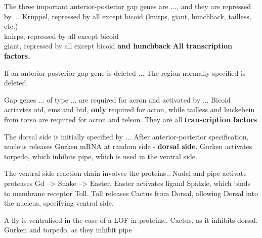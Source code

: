
\begin{flashcard}{The three important anterior-posterior gap genes are ..., and they are repressed by ...}
    Krüppel, repressed by all except bicoid (knirps, giant, hunchback, tailless, etc.) \\
    knirps, repressed by all except bicoid \\
    giant, repressed by all except bicoid \textbf{and hunchback}
    \textbf{All transcription factors.}
\end{flashcard}

\begin{flashcard}{If an anterior-posterior gap gene is deleted ...}
    The region normally specified is deleted.
\end{flashcard}

\begin{flashcard}{Gap genes ... of type ... are required for acron and activated by ...}
    Bicoid actiavtes otd, ems and btd, \textbf{only} required for acron, while tailless and huckebein from torso are required for acron and telson. They are all \textbf{transcription factors}
\end{flashcard}

\begin{flashcard}{The dorsal side is initially specified by ...}
    After anterior-posterior specification, nucleus releases Gurken mRNA at random side - \textbf{dorsal side}. Gurken activates torpedo, which inhibits pipe, which is used in the ventral side. 
\end{flashcard}

\begin{flashcard}{The ventral side reaction chain involves the proteins..}
    Nudel and pipe activate proteases Gd --> Snake --> Easter. Easter activates ligand Spätzle, which binds to membrane receptor Toll. Toll releases Cactus from Dorsal, allowing Dorsal into the nucleus, specifying ventral side. 
\end{flashcard}


\begin{flashcard}{A fly is ventralised in the case of a LOF in proteins..}
    Cactus, as it inhibits dorsal. Gurken and torpedo, as they inhibit pipe
\end{flashcard}

